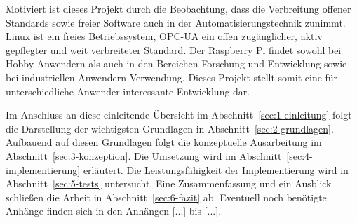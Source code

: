 Motiviert ist dieses Projekt durch die Beobachtung, dass die Verbreitung offener
Standards sowie freier Software auch in der Automatisierungstechnik zunimmt.
Linux ist ein freies Betriebssystem, OPC-UA ein offen zugänglicher, aktiv gepflegter
und weit verbreiteter Standard. Der Raspberry Pi findet sowohl bei Hobby-Anwendern als
auch in den Bereichen Forschung und Entwicklung sowie bei industriellen Anwendern
Verwendung. Dieses Projekt stellt somit eine für unterschiedliche Anwender interessante
Entwicklung dar.

Im Anschluss an diese einleitende Übersicht im Abschnitt~\ref{sec:1-einleitung} folgt
die Darstellung der wichtigsten Grundlagen in Abschnitt~\ref{sec:2-grundlagen}.
Aufbauend auf diesen Grundlagen folgt die konzeptuelle Ausarbeitung im Abschnitt~\ref{sec:3-konzeption}.
Die Umsetzung wird im Abschnitt~\ref{sec:4-implementierung} erläutert.
Die Leistungsfähigkeit der Implementierung wird in Abschnitt~\ref{sec:5-tests} untersucht.
Eine Zusammenfassung und ein Ausblick schließen die Arbeit in
Abschnitt~\ref{sec:6-fazit} ab. Eventuell noch benötigte Anhänge
finden sich in den Anhängen [...] bis [...].
